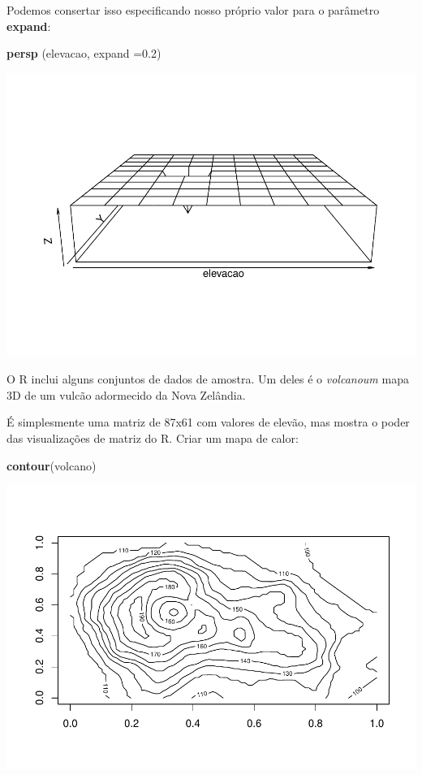 \documentclass[
]{book}
\newenvironment{Shaded}{\begin{snugshade}}{\end{snugshade}}
\newcommand{\DataTypeTok}[1]{\textcolor[rgb]{0.13,0.29,0.53}{#1}}
\newcommand{\FloatTok}[1]{\textcolor[rgb]{0.00,0.00,0.81}{#1}}
\newcommand{\KeywordTok}[1]{\textcolor[rgb]{0.13,0.29,0.53}{\textbf{#1}}}
\newcommand{\NormalTok}[1]{#1}
\begin{document}
Podemos consertar isso especificando nosso próprio valor para o parâmetro \textbf{expand}:

\begin{Shaded}
\begin{Highlighting}[]
\KeywordTok{persp}\NormalTok{ (elevacao, }\DataTypeTok{expand =}\FloatTok{0.2}\NormalTok{)}
\end{Highlighting}
\end{Shaded}

\includegraphics{TudodoR_files/figure-latex/unnamed-chunk-73-1.pdf}

O R inclui alguns conjuntos de dados de amostra. Um deles é o \emph{volcanoum} mapa 3D de um vulcão adormecido da Nova Zelândia.

É simplesmente uma matriz de 87x61 com valores de elevão, mas mostra o poder das visualizações de matriz do R. Criar um mapa de calor:

\begin{Shaded}
\begin{Highlighting}[]
\KeywordTok{contour}\NormalTok{(volcano)}
\end{Highlighting}
\end{Shaded}

\includegraphics{TudodoR_files/figure-latex/unnamed-chunk-74-1.pdf}
\end{document}
